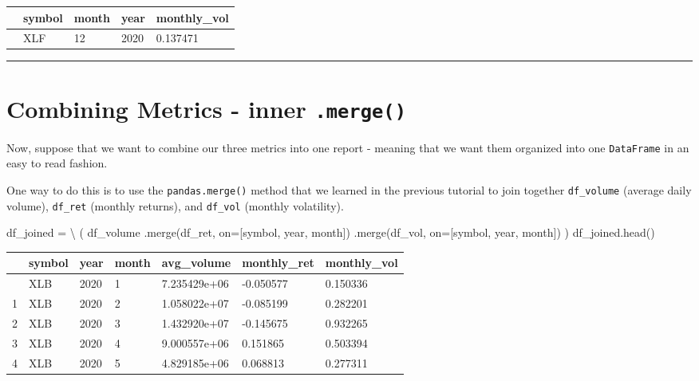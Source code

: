 \documentclass[
  letterpaper,
  DIV=11,
  numbers=noendperiod]{scrreprt}
\newenvironment{Shaded}{\begin{snugshade}}{\end{snugshade}}
\newcommand{\NormalTok}[1]{\textcolor[rgb]{0.00,0.23,0.31}{#1}}
\newcommand{\OperatorTok}[1]{\textcolor[rgb]{0.37,0.37,0.37}{#1}}
\newcommand{\StringTok}[1]{\textcolor[rgb]{0.13,0.47,0.30}{#1}}
\begin{document}
\begin{longtable}[]{@{}lllll@{}}
\toprule\noalign{}
& symbol & month & year & monthly\_vol \\
\midrule\noalign{}
\endhead
\bottomrule\noalign{}
\endlastfoot
35 & XLF & 12 & 2020 & 0.137471 \\
\end{longtable}

\begin{center}\rule{0.5\linewidth}{0.5pt}\end{center}

\hypertarget{combining-metrics---inner-.merge}{%
\section{\texorpdfstring{Combining Metrics - inner
\texttt{.merge()}}{Combining Metrics - inner .merge()}}\label{combining-metrics---inner-.merge}}

Now, suppose that we want to combine our three metrics into one report -
meaning that we want them organized into one \texttt{DataFrame} in an
easy to read fashion.

One way to do this is to use the \texttt{pandas.merge()} method that we
learned in the previous tutorial to join together \texttt{df\_volume}
(average daily volume), \texttt{df\_ret} (monthly returns), and
\texttt{df\_vol} (monthly volatility).

\begin{Shaded}
\begin{Highlighting}[]
\NormalTok{df\_joined }\OperatorTok{=} \OperatorTok{\textbackslash{}}
\NormalTok{    (}
\NormalTok{    df\_volume}
\NormalTok{        .merge(df\_ret, on}\OperatorTok{=}\NormalTok{[}\StringTok{\textquotesingle{}symbol\textquotesingle{}}\NormalTok{, }\StringTok{\textquotesingle{}year\textquotesingle{}}\NormalTok{, }\StringTok{\textquotesingle{}month\textquotesingle{}}\NormalTok{])}
\NormalTok{        .merge(df\_vol, on}\OperatorTok{=}\NormalTok{[}\StringTok{\textquotesingle{}symbol\textquotesingle{}}\NormalTok{, }\StringTok{\textquotesingle{}year\textquotesingle{}}\NormalTok{, }\StringTok{\textquotesingle{}month\textquotesingle{}}\NormalTok{])}
\NormalTok{    )}
\NormalTok{df\_joined.head()}
\end{Highlighting}
\end{Shaded}

\begin{longtable}[]{@{}lllllll@{}}
\toprule\noalign{}
& symbol & year & month & avg\_volume & monthly\_ret & monthly\_vol \\
\midrule\noalign{}
\endhead
\bottomrule\noalign{}
\endlastfoot
0 & XLB & 2020 & 1 & 7.235429e+06 & -0.050577 & 0.150336 \\
1 & XLB & 2020 & 2 & 1.058022e+07 & -0.085199 & 0.282201 \\
2 & XLB & 2020 & 3 & 1.432920e+07 & -0.145675 & 0.932265 \\
3 & XLB & 2020 & 4 & 9.000557e+06 & 0.151865 & 0.503394 \\
4 & XLB & 2020 & 5 & 4.829185e+06 & 0.068813 & 0.277311 \\
\end{longtable}
\end{document}
